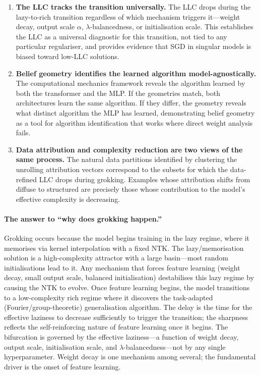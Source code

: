 \documentclass[11pt,a4paper]{article}
\begin{document}
\begin{enumerate}[label=\textbf{\arabic*.}]
    \item \textbf{The LLC tracks the transition universally.} The LLC drops during the lazy-to-rich transition regardless of which mechanism triggers it---weight decay, output scale $\alpha$, $\lambda$-balancedness, or initialisation scale. This establishes the LLC as a universal diagnostic for this transition, not tied to any particular regulariser, and provides evidence that SGD in singular models is biased toward low-LLC solutions.

    \item \textbf{Belief geometry identifies the learned algorithm model-agnostically.} The computational mechanics framework reveals the algorithm learned by both the transformer and the MLP. If the geometries match, both architectures learn the same algorithm. If they differ, the geometry reveals what distinct algorithm the MLP has learned, demonstrating belief geometry as a tool for algorithm identification that works where direct weight analysis fails.

    \item \textbf{Data attribution and complexity reduction are two views of the same process.} The natural data partitions identified by clustering the unrolling attribution vectors correspond to the subsets for which the data-refined LLC drops during grokking. Examples whose attribution shifts from diffuse to structured are precisely those whose contribution to the model's effective complexity is decreasing.
\end{enumerate}

\paragraph{The answer to ``why does grokking happen.''} Grokking occurs because the model begins training in the lazy regime, where it memorises via kernel interpolation with a fixed NTK. The lazy/memorisation solution is a high-complexity attractor with a large basin---most random initialisations lead to it. Any mechanism that forces feature learning (weight decay, small output scale, balanced initialisation) destabilises this lazy regime by causing the NTK to evolve. Once feature learning begins, the model transitions to a low-complexity rich regime where it discovers the task-adapted (Fourier/group-theoretic) generalisation algorithm. The delay is the time for the effective laziness to decrease sufficiently to trigger the transition; the sharpness reflects the self-reinforcing nature of feature learning once it begins. The bifurcation is governed by the effective laziness---a function of weight decay, output scale, initialisation scale, and $\lambda$-balancedness---not by any single hyperparameter. Weight decay is one mechanism among several; the fundamental driver is the onset of feature learning.
\end{document}
